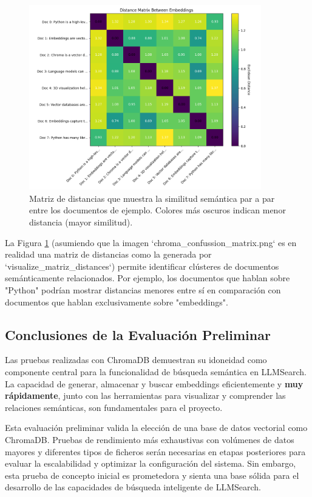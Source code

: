 \begin{figure}[H]
\centering
\includegraphics[width=0.9\textwidth]{archivos/chroma_confussion_matrix.png}
\caption[Matriz de Distancias Semánticas entre Documentos con ChromaDB]{Matriz de distancias que muestra la similitud semántica par a par entre los documentos de ejemplo. Colores más oscuros indican menor distancia (mayor similitud).}
\label{fig:chroma_dist_matrix_eval}
\end{figure}

La Figura \ref{fig:chroma_dist_matrix_eval} (asumiendo que la imagen `chroma\_confussion\_matrix.png` es en realidad una matriz de distancias como la generada por `visualize\_matriz\_distances`) permite identificar clústeres de documentos semánticamente relacionados. Por ejemplo, los documentos que hablan sobre "Python" podrían mostrar distancias menores entre sí en comparación con documentos que hablan exclusivamente sobre "embeddings".

\subsection{Conclusiones de la Evaluación Preliminar}
Las pruebas realizadas con ChromaDB demuestran su idoneidad como componente central para la funcionalidad de búsqueda semántica en LLMSearch. La capacidad de generar, almacenar y buscar embeddings eficientemente y \textbf{muy rápidamente}, junto con las herramientas para visualizar y comprender las relaciones semánticas, son fundamentales para el proyecto.

Esta evaluación preliminar valida la elección de una base de datos vectorial como ChromaDB. Pruebas de rendimiento más exhaustivas con volúmenes de datos mayores y diferentes tipos de ficheros serán necesarias en etapas posteriores para evaluar la escalabilidad y optimizar la configuración del sistema. Sin embargo, esta prueba de concepto inicial es prometedora y sienta una base sólida para el desarrollo de las capacidades de búsqueda inteligente de LLMSearch.

